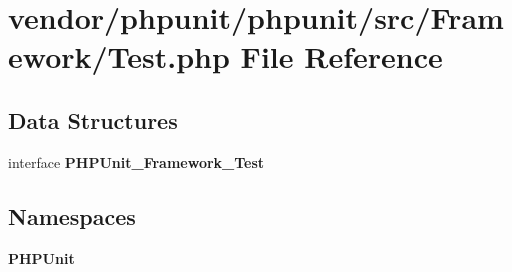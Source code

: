 \section{vendor/phpunit/phpunit/src/\+Framework/\+Test.php File Reference}
\label{_framework_2_test_8php}
\subsection*{Data Structures}
\begin{DoxyCompactItemize}
\item 
interface {\bf P\+H\+P\+Unit\+\_\+\+Framework\+\_\+\+Test}
\end{DoxyCompactItemize}
\subsection*{Namespaces}
\begin{DoxyCompactItemize}
\item 
 {\bf P\+H\+P\+Unit}
\end{DoxyCompactItemize}
